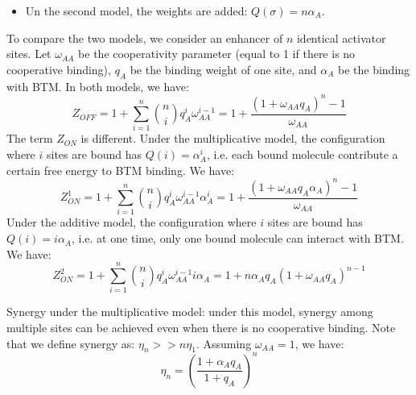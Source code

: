 \documentclass[11pt]{article}
\begin{document}
\begin{enumerate}
\begin{enumerate}
\begin{itemize}
\item Un the second model, the weights are added: $Q(\sigma) = n \alpha_A$. 
\end{itemize} 

To compare the two models, we consider an enhancer of $n$ identical activator sites. Let $\omega_{AA}$ be the cooperativity parameter (equal to 1 if there is no cooperative binding), $q_A$ be the binding weight of one site, and $\alpha_A$ be the binding with BTM. In both models, we have: 
\begin{equation}
Z_{OFF} = 1 + \sum_{i=1}^n {n \choose i}q_A^i \omega_{AA}^{i-1} = 1 + \frac{(1+\omega_{AA}q_A)^n - 1}{\omega_{AA}}
\end{equation}
The term $Z_{ON}$ is different. Under the multiplicative model, the configuration where $i$ sites are bound has $Q(i) = \alpha_A^i$, i.e. each bound molecule contribute a certain free energy to BTM binding. We have:
\begin{equation}
Z_{ON}^{1} = 1 + \sum_{i=1}^n {n \choose i}q_A^i \omega_{AA}^{i-1} \alpha_A^i = 1 + \frac{(1+\omega_{AA}q_A \alpha_A)^n - 1}{\omega_{AA}}
\end{equation}
Under the additive model, the configuration where $i$ sites are bound has $Q(i) = i \alpha_A$, i.e. at one time, only one bound molecule can interact with BTM. We have: 
\begin{equation}
Z_{ON}^{2} = 1 + \sum_{i=1}^n {n \choose i}q_A^i \omega_{AA}^{i-1} i \alpha_A = 1 + n \alpha_A q_A (1+\omega_{AA}q_A)^{n - 1}
\end{equation}

Synergy under the multiplicative model: under this model, synergy among multiple sites can be achieved even when there is no cooperative binding. Note that we define synergy as: $\eta_n >> n \eta_1$. Assuming $\omega_{AA} = 1$, we have: 
\begin{equation}
\eta_n = \left( \frac{1 + \alpha_A q_A}{1 + q_A} \right)^n
\end{equation}


\end{enumerate}
\end{enumerate}
\end{document}

